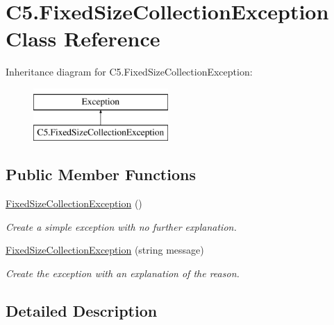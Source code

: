 \hypertarget{class_c5_1_1_fixed_size_collection_exception}{}\section{C5.\+Fixed\+Size\+Collection\+Exception Class Reference}
\label{class_c5_1_1_fixed_size_collection_exception}


 


Inheritance diagram for C5.\+Fixed\+Size\+Collection\+Exception\+:\begin{figure}[H]
\begin{center}
\leavevmode
\includegraphics[height=2.000000cm]{class_c5_1_1_fixed_size_collection_exception}
\end{center}
\end{figure}
\subsection*{Public Member Functions}
\begin{DoxyCompactItemize}
\item 
\hyperlink{class_c5_1_1_fixed_size_collection_exception_a7d03d1dfcd8346fd83a5fe1a585632d9}{Fixed\+Size\+Collection\+Exception} ()
\begin{DoxyCompactList}\small\item\em Create a simple exception with no further explanation. \end{DoxyCompactList}\item 
\hyperlink{class_c5_1_1_fixed_size_collection_exception_add85f9d2208c64dd9bc74a6c1a31733b}{Fixed\+Size\+Collection\+Exception} (string message)
\begin{DoxyCompactList}\small\item\em Create the exception with an explanation of the reason. \end{DoxyCompactList}\end{DoxyCompactItemize}


\subsection{Detailed Description}





